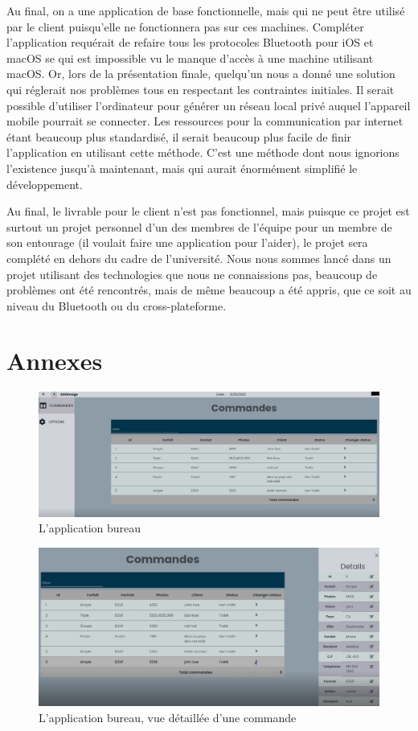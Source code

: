 \documentclass[12pt,fleqn]{article}
\begin{document}
Au final, on a une application de base fonctionnelle, mais qui ne peut être utilisé par le client puisqu’elle ne fonctionnera pas sur ces machines. Compléter l’application requérait de refaire tous les protocoles Bluetooth pour iOS et macOS se qui est impossible vu le manque d’accès à une machine utilisant macOS. Or, lors de la présentation finale, quelqu’un nous a donné une solution qui réglerait nos problèmes tous en respectant les contraintes initiales. Il serait possible d’utiliser l’ordinateur pour générer un réseau local privé auquel l’appareil mobile pourrait se connecter. Les ressources pour la communication par internet étant beaucoup plus standardisé, il serait beaucoup plus facile de finir l’application en utilisant cette méthode. C’est une méthode dont nous ignorions l’existence jusqu’à maintenant, mais qui aurait énormément simplifié le développement.

Au final, le livrable pour le client n’est pas fonctionnel, mais puisque ce projet est surtout un projet personnel d’un des membres de l’équipe pour un membre de son entourage (il voulait faire une application pour l’aider), le projet sera complété en dehors du cadre de l’université. Nous nous sommes lancé dans un projet utilisant des technologies que nous ne connaissions pas, beaucoup de problèmes ont été rencontrés, mais de même beaucoup a été appris, que ce soit au niveau du Bluetooth ou du cross-plateforme.

\section{Annexes}

\begin{figure}[H]
  \includegraphics[width=\textwidth]{images/AppBureau.png}
  \caption{L'application bureau}
\end{figure}

\begin{figure}[H]
  \includegraphics[width=\textwidth]{images/AppBureauDetail.png}
  \caption{L'application bureau, vue détaillée d'une commande}
\end{figure}
\end{document}
